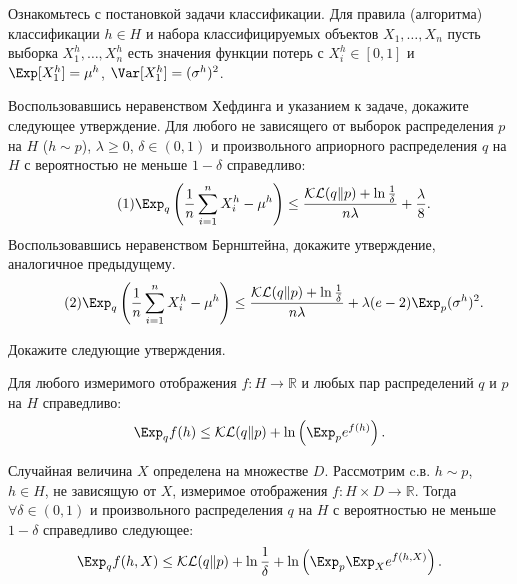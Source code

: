 \begin{problem}
Ознакомьтесь с постановкой задачи классификации. 
Для правила (алгоритма) классификации $h \in H$ и набора классифицируемых объектов $X_1, \ldots, X_n$ пусть выборка $X_1^h, \ldots, X_n^h$ есть значения функции потерь  с $X_i^h \in [0,1]$ и $\Exp[X_1^h] = \mu^h$, $\Var[X_1^h]=(\sigma^h)^2$. 

Воспользовавшись неравенством Хефдинга и указанием к задаче, докажите следующее утверждение.
Для любого не зависящего от выборок распределения $p$ на $H$ ($h \sim p$), $\lambda \geq 0$, $\delta \in (0, 1)$ и произвольного априорного распределения $q$ на $H$ с вероятностью не меньше $1 - \delta$  справедливо:
\[\tag{1}
\Exp_q \left( 
\frac{1}{n} \sum_{i=1}^n X_i^h - \mu^h
\right) \leq
\frac{\mathcal{KL} (q \Vert p) + \ln \frac{1}{\delta}  }{n \lambda} + \frac{\lambda}{8}.
 \]
Воспользовавшись неравенством Бернштейна, докажите утверждение, аналогичное предыдущему.
 \[\tag{2}
\Exp_q \left( 
\frac{1}{n} \sum_{i=1}^n X_i^h - \mu^h
\right) \leq
\frac{\mathcal{KL} (q \Vert p) + \ln \frac{1}{\delta}  }{n \lambda} + \lambda (e-2) \Exp_p (\sigma^h)^2.
 \]


\end{problem}

\begin{ordre}
Докажите следующие утверждения.

Для любого измеримого отображения $f : H \to \mathbb{R}$ и любых пар распределений $q$ и $p$ на $H$ справедливо:
\[
\Exp_q f(h) \leq  \mathcal{KL} (q \Vert p)  + \ln \left( \Exp_p e^{f(h)} \right).
\]

Случайная величина $X$ определена на множестве $D$.  Рассмотрим c.в.  $h \sim p$, $h \in H$, не зависящую от $X$,   измеримое отображения $f : H \times D \to \mathbb{R}$. Тогда $\forall \delta \in (0, 1)$ и произвольного распределения $q$ на $H$   с вероятностью не меньше $1 - \delta$ справедливо следующее:
\[
\Exp_q f(h, X) \leq \mathcal{KL} (q \Vert p) + \ln \frac{1}{\delta} + \ln \left( \Exp_p \Exp_X e^{f(h,X)} \right).
\]

\end{ordre}

